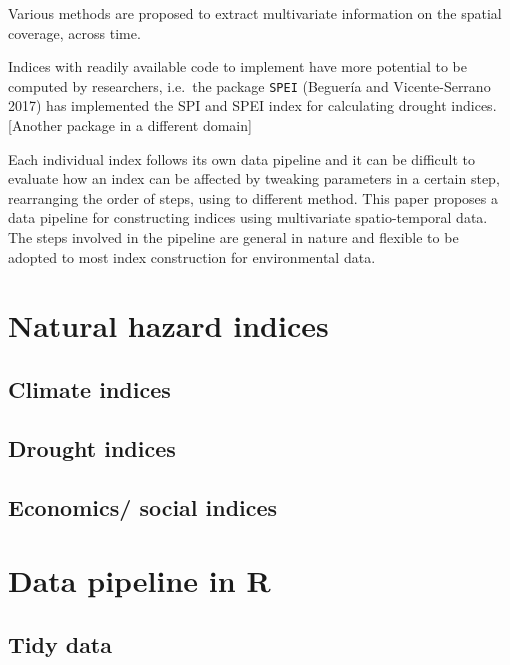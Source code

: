 \documentclass[
]{article}
\begin{document}
Various methods are proposed to extract multivariate information on the
spatial coverage, across time.

Indices with readily available code to implement have more potential to
be computed by researchers, i.e.~the package \texttt{SPEI} (Beguería and
Vicente-Serrano 2017) has implemented the SPI and SPEI index for
calculating drought indices. {[}Another package in a different domain{]}

Each individual index follows its own data pipeline and it can be
difficult to evaluate how an index can be affected by tweaking
parameters in a certain step, rearranging the order of steps, using to
different method. This paper proposes a data pipeline for constructing
indices using multivariate spatio-temporal data. The steps involved in
the pipeline are general in nature and flexible to be adopted to most
index construction for environmental data.

\hypertarget{natural-hazard-indices}{%
\section{Natural hazard indices}\label{natural-hazard-indices}}

\hypertarget{climate-indices}{%
\subsection{Climate indices}\label{climate-indices}}

\hypertarget{drought-indices}{%
\subsection{Drought indices}\label{drought-indices}}

\hypertarget{economics-social-indices}{%
\subsection{Economics/ social indices}\label{economics-social-indices}}

\hypertarget{data-pipeline-in-r}{%
\section{Data pipeline in R}\label{data-pipeline-in-r}}

\hypertarget{tidy-data}{%
\subsection{Tidy data}\label{tidy-data}}
\end{document}
